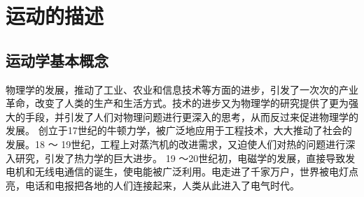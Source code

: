 \documentclass[a4paper,fontset = windowsnew]{ctexbook}
\begin{document}
\chapter{运动的描述}
\section{运动学基本概念}
 物理学的发展，推动了工业、农业和信息技术等方面的进步，引发了一次次的产业革命，改变了人类的生产和生活方式。技术的进步又为物理学的研究提供了更为强大的手段，并引发了人们对物理问题进行更深入的思考，从而反过来促进物理学的发展。
 创立于17世纪的牛顿力学，被广泛地应用于工程技术，大大推动了社会的发展。18 ～ 19世纪，工程上对蒸汽机的改进需求，又迫使人们对热的问题进行深入研究，引发了热力学的巨大进步。
  19 ～20世纪初，电磁学的发展，直接导致发电机和无线电通信的诞生，使电能被广泛利用。电走进了千家万户，世界被电灯点亮，电话和电报把各地的人们连接起来，人类从此进入了电气时代。
\end{document}
